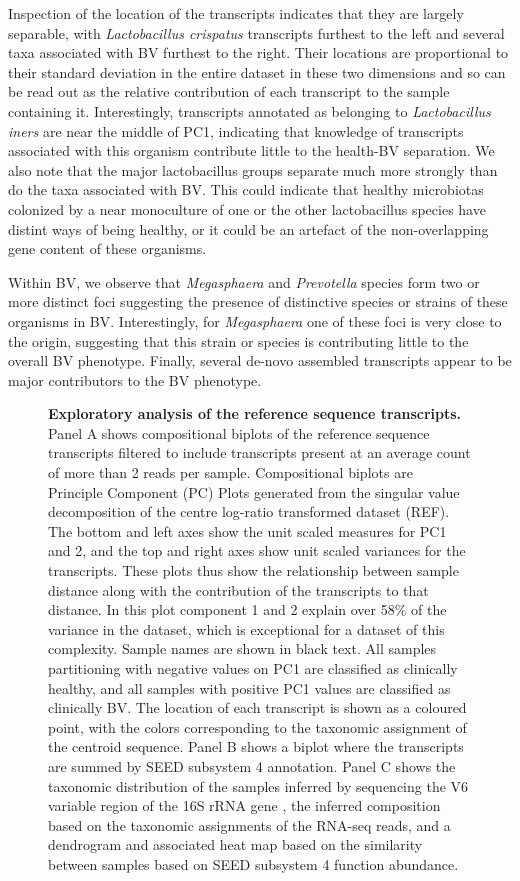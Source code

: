 \documentclass[10pt,letterpaper]{article}
\begin{document}
Inspection of the location of the transcripts indicates that they are largely separable, with \emph{Lactobacillus crispatus} transcripts furthest to the left and several taxa associated with BV furthest to the right. Their locations are proportional to their standard deviation in the entire dataset in these two dimensions and so can be read out as the relative contribution of each transcript to the sample containing it. Interestingly, transcripts annotated as belonging to \emph{Lactobacillus iners} are near the middle of PC1, indicating that knowledge of transcripts associated with this organism contribute little to the health-BV separation. We also note that the major lactobacillus groups separate much more strongly than do the taxa associated with BV. This could indicate that healthy microbiotas colonized by a near monoculture of one or the other lactobacillus species have distint ways of being healthy, or it could be an artefact of the non-overlapping gene content of these organisms.  

Within BV, we observe that \emph{Megasphaera} and \emph{Prevotella} species form two or more distinct foci suggesting the presence of distinctive species or strains of these organisms in BV. Interestingly, for \emph{Megasphaera} one of these foci is very close to the origin, suggesting that this strain or species is contributing little to the overall BV phenotype. Finally, several de-novo assembled transcripts appear to be major contributors to the BV phenotype.


\begin{figure}[h]
\caption{{\bf Exploratory analysis of the reference sequence transcripts.}
Panel A shows compositional biplots of the reference sequence transcripts filtered to include transcripts present at an average count of more than 2 reads per sample. Compositional biplots are Principle Component (PC) Plots generated from the singular value decomposition of the centre log-ratio transformed dataset (REF). The bottom and left axes show the unit scaled measures for PC1 and 2, and the top and right axes show unit scaled variances for the transcripts. These plots thus show the relationship between sample distance along with the contribution of the transcripts to that distance. In this plot component 1 and 2 explain over 58\% of the variance in the dataset, which is exceptional for a dataset of this complexity. Sample names are shown in black text. All samples partitioning with negative values on PC1 are classified as clinically healthy, and all samples with positive PC1 values are classified as clinically BV. The location of each transcript is shown as a coloured point, with the colors corresponding to the taxonomic assignment of the centroid sequence. Panel B shows a biplot where the transcripts are summed by SEED subsystem 4 annotation. Panel C shows the taxonomic distribution of the samples inferred by sequencing the V6 variable region of the 16S rRNA gene , the inferred composition based on the taxonomic assignments of the RNA-seq reads, and a dendrogram and associated heat map based on the similarity between samples based on SEED subsystem 4 function abundance.}
\label{F1:refseq_biplot}
\end{figure}
\end{document}
